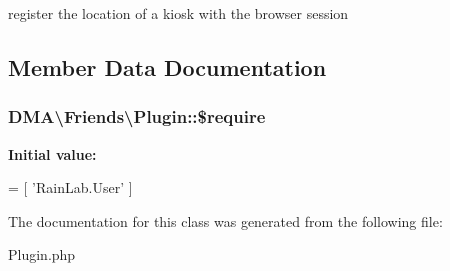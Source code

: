 register the location of a kiosk with the browser session 


\subsection{Member Data Documentation}
\hypertarget{classDMA_1_1Friends_1_1Plugin_a3c98aaa659a7b26aaef32d2767f14738}{
\subsubsection[{\$require}]{\setlength{\rightskip}{0pt plus 5cm}D\+M\+A\textbackslash{}\+Friends\textbackslash{}\+Plugin\+::\$require}}\label{classDMA_1_1Friends_1_1Plugin_a3c98aaa659a7b26aaef32d2767f14738}
{\bfseries Initial value\+:}
\begin{DoxyCode}
= [
        \textcolor{stringliteral}{'RainLab.User'}
    ]
\end{DoxyCode}


The documentation for this class was generated from the following file\+:\begin{DoxyCompactItemize}
\item 
Plugin.\+php\end{DoxyCompactItemize}
